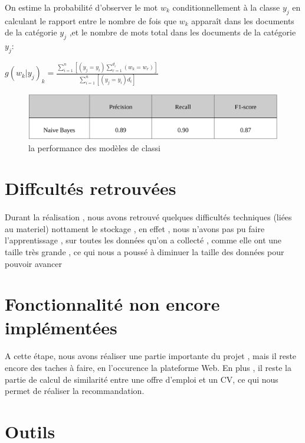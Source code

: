 \documentclass{article}
\begin{document}
On estime la probabilité d'observer le mot $w_k$ conditionnellement à la classe $y_j$ en calculant le rapport entre le nombre de fois que $w_k$ apparaît dans les documents de la catégorie $y_j$ ,et le nombre de mots total dans les documents de la catégorie $y_j$:
\newline

\begin{center}
$g(w_k|y_j)_k=\frac{\sum_{i=1}^n [(y_j=y_i)\sum_{r=1}^{d_i}(w_k=w_r)]}{\sum_{i=1}^n [(y_j=y_i) d_i ] }$
\end{center}
\begin{figure}[H]
  \centering
      \includegraphics[width=1.0\textwidth]{Figures/table.PNG}
    \caption{la performance des modèles de classi}
  \label{json}
\end{figure}

\section{Diffcultés retrouvées}
\paragraph{}Durant la réalisation , nous avons retrouvé quelques difficultés techniques (liées au materiel) nottament le stockage , en effet , nous n'avons pas pu faire l'apprentissage , sur toutes les données qu'on a collecté , comme elle ont une taille très grande , ce qui nous a poussé à diminuer la taille des données pour pouvoir avancer 
\section{Fonctionnalité non encore implémentées}
\paragraph{}A cette étape, nous avons réaliser une partie importante du projet , mais il reste encore des taches à faire, en l'occurence la plateforme Web.
En plus , il reste la partie de calcul de similarité entre une offre d'emploi et un CV, ce qui nous permet de réaliser la recommandation.


\section{Outils}
\end{document}
